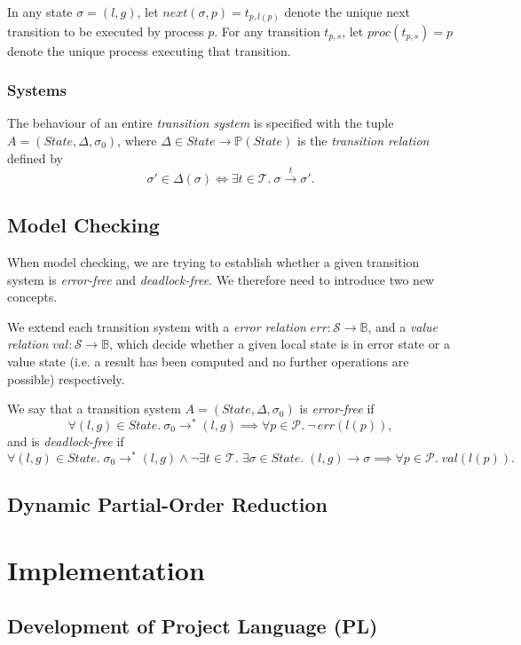 \documentclass[12pt,a4paper,twoside,openright]{report}
\begin{document}
In any state $\sigma = (l, g)$, let
$next(\sigma, p) = t_{p,l(p)}$ denote the unique next transition
to be executed by process $p$. For any transition $t_{p,s}$, let
$proc(t_{p,s}) = p$ denote the unique process executing that transition.

\subsection{Systems}
The behaviour of an entire \emph{transition system} is
specified with the tuple $A = (State, \Delta, \sigma_0)$,
where $\Delta \in State \to \mathbb{P}(State)$
is the \emph{transition relation} defined by
\[
	\sigma' \in \Delta(\sigma) \iff
	\exists t \in \mathcal{T}. \ \sigma \xrightarrow{t} \sigma'.
\]

\section{Model Checking}

When model checking, we are trying to establish whether a
given transition system is \emph{error-free} and
\emph{deadlock-free}. We therefore need to introduce two
new concepts.

We extend each transition system with a \emph{error relation}
$err : \mathcal{S} \to \mathbb{B}$, and a \emph{value relation}
$val : \mathcal{S} \to \mathbb{B}$, which decide whether a given
local state is in error state or a value state (i.e. a result has
been computed and no further operations are possible) respectively.

We say that a transition system $A = (State, \Delta, \sigma_0)$ is
\emph{error-free} if
\[
	\forall (l, g) \in State. \ \sigma_0 \longrightarrow^* (l, g)
	\implies \forall p \in \mathcal{P}.\ \neg\,err(l(p)),
\]
and is \emph{deadlock-free} if
\[
	\forall (l, g) \in State. \;\sigma_0 \longrightarrow^* (l, g)
	\wedge \neg \exists t \in \mathcal{T}.\;
		\exists\sigma \in State.\;(l, g) \longrightarrow \sigma
	\implies \forall p \in \mathcal{P}.\;val(l(p)).
\]

\section{Dynamic Partial-Order Reduction}


\chapter{Implementation}

\section{Development of Project Language (PL)}
\end{document}
